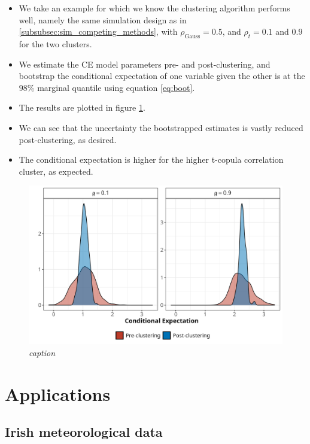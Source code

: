\documentclass{article}
\numberwithin{equation}{section}
\begin{document}
\begin{itemize}
  \item We take an example for which we know the clustering algorithm performs well, namely the same simulation design as in \ref{subsubsec:sim_competing_methods}, with $\rho_{\text{Gauss}} = 0.5$, and $\rho_{t} = 0.1$ and $0.9$ for the two clusters.
  \item We estimate the CE model parameters pre- and post-clustering, and bootstrap the conditional expectation of one variable given the other is at the $98\%$ marginal quantile using equation \ref{eq:boot}.
  \item The results are plotted in figure \ref{fig:04_bootstrap}.
  \item We can see that the uncertainty the bootstrapped estimates is vastly reduced post-clustering, as desired.
  \item The conditional expectation is higher for the higher t-copula correlation cluster, as expected.

\end{itemize}

\begin{figure}[H]
    \centering
    \includegraphics[width = 0.9\linewidth]{plots/sim_01e_bootstrap.png}
    \caption{\emph{caption}}
    \label{fig:04_bootstrap}
\end{figure}


\section{Applications}
\subsection{Irish meteorological data} \label{subsec:app_irl}
\end{document}
